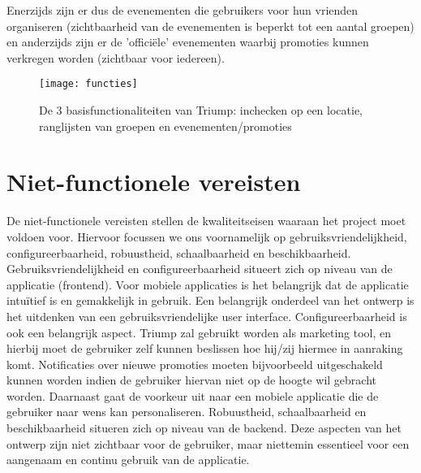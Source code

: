 Enerzijds zijn er dus de evenementen die gebruikers voor hun vrienden organiseren (zichtbaarheid van de evenementen is beperkt tot een aantal groepen) en anderzijds zijn er de 'officiële' evenementen waarbij promoties kunnen verkregen worden (zichtbaar voor iedereen). 
\begin{figure}[H]
	\centering
	\texttt{[image: functies]}
	\label{fig:functions}
	\caption{De 3 basisfunctionaliteiten van Triump: inchecken op een locatie, \newline ranglijsten van groepen en evenementen/promoties}
\end{figure}
\section{Niet-functionele vereisten}
De niet-functionele vereisten stellen de kwaliteitseisen waaraan het project moet voldoen voor. Hiervoor focussen we ons voornamelijk op gebruiksvriendelijkheid, configureerbaarheid, robuustheid, schaalbaarheid en beschikbaarheid.
Gebruiksvriendelijkheid en configureerbaarheid situeert zich op niveau van de applicatie (frontend). Voor mobiele applicaties is het belangrijk dat de applicatie intuïtief is en gemakkelijk in gebruik. Een belangrijk onderdeel van het ontwerp is het uitdenken van een gebruiksvriendelijke user interface. Configureerbaarheid is ook een belangrijk aspect. Triump zal gebruikt worden als marketing tool, en hierbij moet de gebruiker zelf kunnen beslissen hoe hij/zij hiermee in aanraking komt. Notificaties over nieuwe promoties moeten bijvoorbeeld uitgeschakeld kunnen worden indien de gebruiker hiervan niet op de hoogte wil gebracht worden. Daarnaast gaat de voorkeur uit naar een mobiele applicatie die de gebruiker naar wens kan personaliseren.
Robuustheid, schaalbaarheid en beschikbaarheid situeren zich op niveau van de backend. Deze aspecten van het ontwerp zijn niet zichtbaar voor de gebruiker, maar niettemin essentieel voor een aangenaam en continu gebruik van de applicatie.
